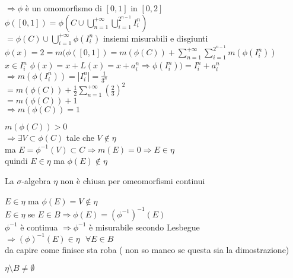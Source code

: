 \documentclass[12px]{article}
\begin{document}
\begin{dimo}
	  $ \Rightarrow  \phi$ è un omomorfismo di $[0,1]$ in $[0,2]$  $\phi([0,1]) = \phi (C \cup \bigcup^{+\infty}_{n = 1} \bigcup^{2^{n-1}}_{i = 1}I_i^n)$\\
	  $= \phi(C)\cup \bigcup^{+\infty}_{i = 1}\phi(I_i^n)$ insiemi misurabili e disgiunti\\
	  $\phi(x) = 2 =m(\phi([0,1]) = m(\phi(C)) + \sum^{+\infty}_{n = 1} \sum^{2^{n-1}}_{i =1}m(\phi(I_i^n))$ \\
$x\in I^n_i$  $ \phi(x) = x + L(x) = x + a^n_i \Rightarrow \phi(I^n_i)) = I_i^n + a^n_i$ \\
$ \Rightarrow m( \phi(I^n_i)) = |I_i^n| = \frac {1}{3^n}$ \\
$ = m(\phi(C))  + \frac 12 \sum^{+\infty}_{n = 1}(\frac 23)^2$ \\
$ = m(\phi(C)) + 1$ \\
$ \Rightarrow  m(\phi(C)) = 1$ \\
  \end{dimo}
$m(\phi(C)) > 0 $\\
 $ \Rightarrow \exists V \subset \phi(C)$ tale che $V\not \in \eta$\\
 ma $E = \phi^{-1}(V)\subset C \Rightarrow  m(E) = 0 \Rightarrow E\in\eta$ \\
 quindi $E\in\eta $ ma  $\phi(E)\not\in \eta$
  \begin{prop}
 	La $\sigma$-algebra $\eta$ non è chiusa per omeomorfismi continui
 \end{prop}
 \begin{dimo}
 	$E\in\eta$ ma  $\phi(E) = V\not\in\eta$\\
	$E\in \eta$ se  $E\in B \Rightarrow \phi(E) = (\phi^{-1})^{-1}(E)$ \\
	$\phi^{-1}$ è continua $ \Rightarrow  \phi^{-1} $ è misurabile secondo Lesbegue\\
	$ \Rightarrow (\phi)^{-1}(E)\in\eta \ \ \ \forall E\in B$ \\
da capire come finisce sta roba ( non so manco se questa sia la dimostrazione)
 \end{dimo}
 \begin{prop}
 	$\eta\setminus B\neq\emptyset$
 \end{prop}

	
\end{document}
